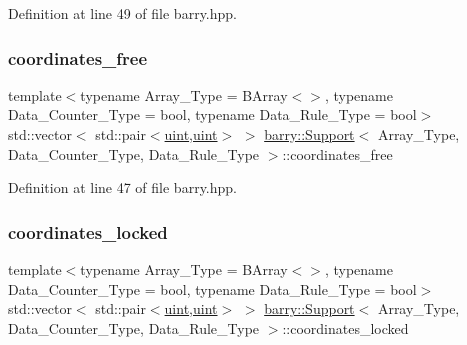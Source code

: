 Definition at line 49 of file barry.\+hpp.

\mbox{\label{classbarry_1_1_support_aa235837435a5ed7ac540481676333b88}} 
\subsubsection{\texorpdfstring{coordinates\+\_\+free}{coordinates\_free}}
{\footnotesize\ttfamily template$<$typename Array\+\_\+\+Type = B\+Array$<$$>$, typename Data\+\_\+\+Counter\+\_\+\+Type = bool, typename Data\+\_\+\+Rule\+\_\+\+Type = bool$>$ \\
std\+::vector$<$ std\+::pair$<$\hyperlink{namespacebarry_a11dfc53ddb4672278319aa04f1e09a6c}{uint},\hyperlink{namespacebarry_a11dfc53ddb4672278319aa04f1e09a6c}{uint}$>$ $>$ \hyperlink{classbarry_1_1_support}{barry\+::\+Support}$<$ Array\+\_\+\+Type, Data\+\_\+\+Counter\+\_\+\+Type, Data\+\_\+\+Rule\+\_\+\+Type $>$\+::coordinates\+\_\+free}



Definition at line 47 of file barry.\+hpp.

\mbox{\label{classbarry_1_1_support_a3abcd564b19c7399b596a5b63c72b149}} 
\subsubsection{\texorpdfstring{coordinates\+\_\+locked}{coordinates\_locked}}
{\footnotesize\ttfamily template$<$typename Array\+\_\+\+Type = B\+Array$<$$>$, typename Data\+\_\+\+Counter\+\_\+\+Type = bool, typename Data\+\_\+\+Rule\+\_\+\+Type = bool$>$ \\
std\+::vector$<$ std\+::pair$<$\hyperlink{namespacebarry_a11dfc53ddb4672278319aa04f1e09a6c}{uint},\hyperlink{namespacebarry_a11dfc53ddb4672278319aa04f1e09a6c}{uint}$>$ $>$ \hyperlink{classbarry_1_1_support}{barry\+::\+Support}$<$ Array\+\_\+\+Type, Data\+\_\+\+Counter\+\_\+\+Type, Data\+\_\+\+Rule\+\_\+\+Type $>$\+::coordinates\+\_\+locked}



